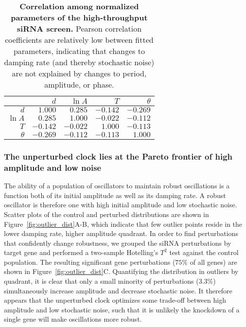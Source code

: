 \documentclass[11pt, letterpaper]{article}
\begin{document}
\begin{table}
  \begin{center}
    \begin{tabular}{rrrrr}
      \toprule
      {}       & $d$    & $\ln A$ & $T$    & $\theta$ \\\midrule
      $d$      & $1.000 $ & $0.285 $  & $-0.142$ & $-0.269$\\
      $\ln A$  & $0.285 $ & $1.000 $  & $-0.022$ & $-0.112$\\
      $T$      & $-0.142$ & $-0.022$  & $1.000 $ & $-0.113$\\
      $\theta$ & $-0.269$ & $-0.112$  & $-0.113$ & $1.000 $\\
      \bottomrule
    \end{tabular}
  \end{center}
  \caption{{\bfseries Correlation among normalized parameters of the high-throughput siRNA screen.} Pearson correlation coefficients are relatively low between fitted parameters, indicating that changes to damping rate (and thereby stochastic noise) are not explained by changes to period, amplitude, or phase.}
  \label{tab:corr}
\end{table}


\subsubsection*{The unperturbed clock lies at the Pareto frontier of high amplitude and low noise}

The ability of a population of oscillators to maintain robust oscillations is a function both of its initial amplitude as well as its damping rate.
A robust oscillator is therefore one with high initial amplitude and low stochastic noise.
Scatter plots of the control and perturbed distributions are shown in Figure~\ref{fig:outlier_dist}A-B, which indicate that few outlier points reside in the lower damping rate, higher amplitude quadrant.
In order to find perturbations that confidently change robustness, we grouped the siRNA perturbations by target gene and performed a two-sample Hotelling's $T^2$ test against the control population.
The resulting significant gene perturbations ($75\%$ of all genes) are shown in Figure~\ref{fig:outlier_dist}C.
Quantifying the distribution in outliers by quadrant, it is clear that only a small minority of perturbations ($3.3\%$) simultaneously increase amplitude and decrease stochastic noise.
It therefore appears that the unperturbed clock optimizes some trade-off between high amplitude and low stochastic noise, such that it is unlikely the knockdown of a single gene will make oscillations more robust. 
\end{document}
